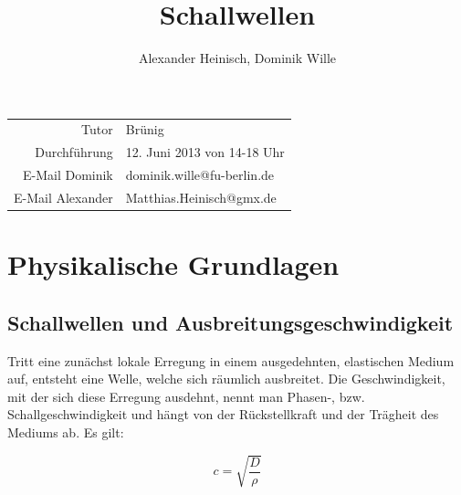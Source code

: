 \documentclass{article}
\title{Schallwellen}
\author{Alexander Heinisch, Dominik Wille}
\begin{document}
\maketitle

{\begin{center}
\begin{minipage}{\linewidth}
\centering
{}
\label{wtd}
\end{minipage}
\end{center}

\vspace{7cm}
\noindent
\begin{center}
\begin{tabular}{r l}
Tutor & Brünig\\
Durchführung & 12. Juni 2013 von 14-18 Uhr \\

E-Mail Dominik & dominik.wille@fu-berlin.de \\
E-Mail Alexander & Matthias.Heinisch@gmx.de \\
\end{tabular}
\end{center}

\newpage
\tableofcontents
\newpage

\section{Physikalische Grundlagen}
\subsection{Schallwellen und Ausbreitungsgeschwindigkeit}
Tritt eine zunächst lokale Erregung in einem ausgedehnten, elastischen Medium auf, entsteht eine Welle, welche sich räumlich ausbreitet. Die Geschwindigkeit, mit der sich diese Erregung ausdehnt, nennt man Phasen-, bzw. Schallgeschwindigkeit und hängt von der Rückstellkraft und der Trägheit des Mediums ab. Es gilt:

\begin{equation}
\label{c}
c=\sqrt{\frac{D}{\rho}}
\end{equation}

}
\end{document}
